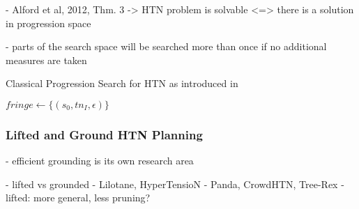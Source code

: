 	- Alford et al, 2012, Thm. 3 -> HTN problem is solvable <=> there is a solution in progression space
	
	- parts of the search space will be searched more than once if no additional measures are taken
	
\begin{algorithm}
	\caption{Classical Progression Search for HTN as introduced in \cite{holler2020htn}}
	$fringe \gets \{ (s_0, tn_I, \epsilon)\}$\;
\end{algorithm}

\subsubsection{Lifted and Ground HTN Planning}
- efficient grounding is its own research area \cite{behnke2020succinct} 


- lifted vs grounded
	- Lilotane, HyperTensioN
	- Panda, CrowdHTN, Tree-Rex
	- lifted: more general, less pruning?